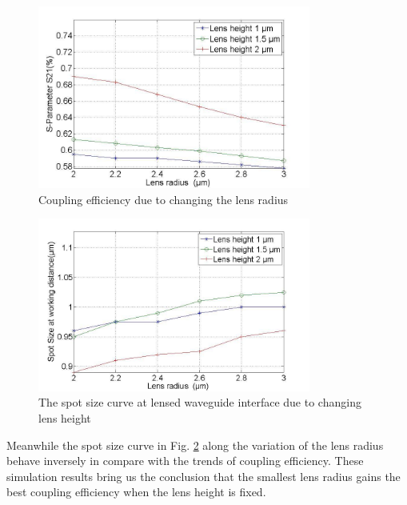 \begin{figure}[!ht]
\centering
\includegraphics[width=0.8\textwidth]{bilder/s21_fix_lens_height_rxx}
\caption{Coupling efficiency due to changing the lens radius}
\label{fig:coupling_lenses_curve_rxx}
\end{figure}
\begin{figure}[!ht]
\centering
\includegraphics[width=0.8\textwidth]{bilder/spot_fix_lens_height_rxx}
\caption{The spot size curve at lensed waveguide interface due to changing lens height}
\label{fig:lensed_guide_spot_size_curve_rxx}
\end{figure}
Meanwhile the spot size curve in Fig. \ref{fig:lensed_guide_spot_size_curve_rxx} along the variation of the lens radius behave inversely in compare with the trends of coupling efficiency. These simulation results bring us the conclusion that the smallest lens radius gains the best coupling efficiency when the lens height is fixed. 
